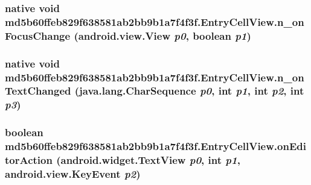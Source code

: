 \hypertarget{classmd5b60ffeb829f638581ab2bb9b1a7f4f3f_1_1_entry_cell_view_b98a6bd62810173fd88534cb64ea87df}{
\subsubsection[{n\_\-onFocusChange}]{\setlength{\rightskip}{0pt plus 5cm}native void md5b60ffeb829f638581ab2bb9b1a7f4f3f.EntryCellView.n\_\-onFocusChange (android.view.View {\em p0}, \/  boolean {\em p1})}}
\label{classmd5b60ffeb829f638581ab2bb9b1a7f4f3f_1_1_entry_cell_view_b98a6bd62810173fd88534cb64ea87df}


\hypertarget{classmd5b60ffeb829f638581ab2bb9b1a7f4f3f_1_1_entry_cell_view_db254e0b3f357d3371ec0461e12da0b2}{
\subsubsection[{n\_\-onTextChanged}]{\setlength{\rightskip}{0pt plus 5cm}native void md5b60ffeb829f638581ab2bb9b1a7f4f3f.EntryCellView.n\_\-onTextChanged (java.lang.CharSequence {\em p0}, \/  int {\em p1}, \/  int {\em p2}, \/  int {\em p3})}}
\label{classmd5b60ffeb829f638581ab2bb9b1a7f4f3f_1_1_entry_cell_view_db254e0b3f357d3371ec0461e12da0b2}


\hypertarget{classmd5b60ffeb829f638581ab2bb9b1a7f4f3f_1_1_entry_cell_view_32acde16da027f419d2b0456f5bc4ada}{
\subsubsection[{onEditorAction}]{\setlength{\rightskip}{0pt plus 5cm}boolean md5b60ffeb829f638581ab2bb9b1a7f4f3f.EntryCellView.onEditorAction (android.widget.TextView {\em p0}, \/  int {\em p1}, \/  android.view.KeyEvent {\em p2})}}
\label{classmd5b60ffeb829f638581ab2bb9b1a7f4f3f_1_1_entry_cell_view_32acde16da027f419d2b0456f5bc4ada}


